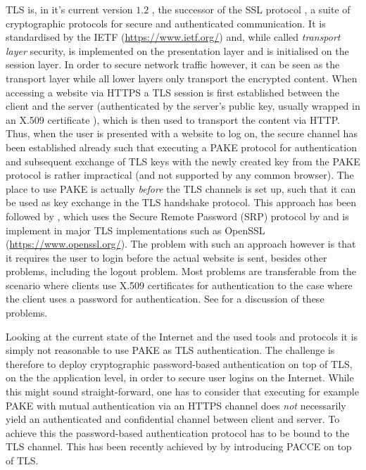 \ac{TLS} is, in it's current version $1.2$ \cite{rfc5246,rfc6176,rfc4492}, the successor of the \ac{SSL} protocol \cite{rfc6101}, a suite of cryptographic protocols for secure and authenticated communication.
It is standardised by the \ac{IETF} (\url{https://www.ietf.org/}) and, while called \emph{transport layer} security, is implemented on the presentation layer and is initialised on the session layer.
In order to secure network traffic however, it can be seen as the transport layer while all lower layers only transport the encrypted content.
When accessing a website via \ac{HTTPS} a \ac{TLS} session is first established between the client and the server (authenticated by the server's public key, usually wrapped in an X.509 certificate \cite{rfc5280}), which is then used to transport the content via \ac{HTTP}.
Thus, when the user is presented with a website to log on, the secure channel has been established already such that executing a \ac{PAKE} protocol for authentication and subsequent exchange of \ac{TLS} keys with the newly created key from the \ac{PAKE} protocol is rather impractical (and not supported by any common browser).
The place to use \ac{PAKE} is actually \emph{before} the \ac{TLS} channels is set up, such that it can be used as key exchange in the \ac{TLS} handshake protocol.
This approach has been followed by \citet{rfc5054}, which uses the Secure Remote Password (SRP) protocol by \citet{Wu98} and is implement in major \ac{TLS} implementations such as OpenSSL (\url{https://www.openssl.org/}).
The problem with such an approach however is that it requires the user to login before the actual website is sent, besides other problems, including the logout problem.
Most problems are transferable from the scenario where clients use X.509 certificates for authentication to the case where the client uses a password for authentication.
See \citet{Parsovs14} for a discussion of these problems.

Looking at the current state of the Internet and the used tools and protocols it is simply not reasonable to use \ac{PAKE} as \ac{TLS} authentication.
The challenge is therefore to deploy cryptographic password-based authentication on top of \ac{TLS}, \ie on the the application level, in order to secure user logins on the Internet.
While this might sound straight-forward, one has to consider that executing for example \ac{PAKE} with mutual authentication via an \ac{HTTPS} channel does \emph{not} necessarily yield an authenticated and confidential channel between client and server.
To achieve this the password-based authentication protocol has to be bound to the \ac{TLS} channel.
This has been recently achieved by \citet{MSD13} by introducing \ac{PACCE} on top of \ac{TLS}.


